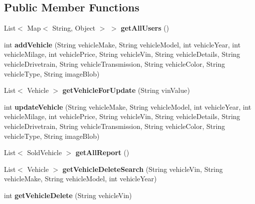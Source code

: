 \subsection*{Public Member Functions}
\begin{DoxyCompactItemize}
\item 
\mbox{\label{classrepository_1_1_administrator_repository_a09e22fa5b41804b2d49469b0ca5109d4}} 
List$<$ Map$<$ String, Object $>$ $>$ {\bfseries get\+All\+Users} ()
\item 
\mbox{\label{classrepository_1_1_administrator_repository_a90a34042a5a989095e35b34c2065ba27}} 
int {\bfseries add\+Vehicle} (String vehicle\+Make, String vehicle\+Model, int vehicle\+Year, int vehicle\+Milage, int vehicle\+Price, String vehicle\+Vin, String vehicle\+Details, String vehicle\+Drivetrain, String vehicle\+Transmission, String vehicle\+Color, String vehicle\+Type, String image\+Blob)
\item 
\mbox{\label{classrepository_1_1_administrator_repository_a33061f1d250592fcb7a37e68b219f976}} 
List$<$ Vehicle $>$ {\bfseries get\+Vehicle\+For\+Update} (String vin\+Value)
\item 
\mbox{\label{classrepository_1_1_administrator_repository_a057b68374cd0321790125d3066e1de8f}} 
int {\bfseries update\+Vehicle} (String vehicle\+Make, String vehicle\+Model, int vehicle\+Year, int vehicle\+Milage, int vehicle\+Price, String vehicle\+Vin, String vehicle\+Details, String vehicle\+Drivetrain, String vehicle\+Transmission, String vehicle\+Color, String vehicle\+Type, String image\+Blob)
\item 
\mbox{\label{classrepository_1_1_administrator_repository_a6ad0837fe4f0191e152ad389199cc0a4}} 
List$<$ Sold\+Vehicle $>$ {\bfseries get\+All\+Report} ()
\item 
\mbox{\label{classrepository_1_1_administrator_repository_a2bb8a7c2e2020236223d15b40a03a7fc}} 
List$<$ Vehicle $>$ {\bfseries get\+Vehicle\+Delete\+Search} (String vehicle\+Vin, String vehicle\+Make, String vehicle\+Model, int vehicle\+Year)
\item 
\mbox{\label{classrepository_1_1_administrator_repository_ad4714a7dbdf9d9696c6e7eb0b850ace6}} 
int {\bfseries get\+Vehicle\+Delete} (String vehicle\+Vin)
\end{DoxyCompactItemize}
